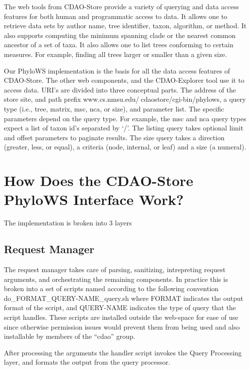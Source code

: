 \documentclass[10pt]{article}
\begin{document}
The web tools from CDAO-Store provide a variety of querying and data access features for both human and programmatic access to data. It allows one to retrieve data sets by author name, tree identifier, taxon, algorithm, or method. It also supports computing the minimum spanning clade or the nearest common ancestor of a set of taxa. It also allows one to list trees conforming to certain measures. For example, finding all trees larger or smaller than a given size. 

Our PhyloWS implementation is the basis for all the data access features of CDAO-Store. The other web components, and the CDAO-Explorer tool use it to access data. URI's are divided into three conceptual parts. The address of the store site, and path prefix www.cs.nmsu.edu/cdaostore/cgi-bin/phylows, a query type (i.e., tree, matrix, msc, nca, or size), and parameter list. The specific parameters depend on the query type. For example, the msc and nca query types expect a list of taxon id's separated by `/'. The listing query takes optional limit and offset parameters to paginate results. The size query takes a direction (greater, less, or equal), a criteria (node, internal, or leaf) and a size (a numeral).

\section{How Does the CDAO-Store PhyloWS Interface Work?}
The implementation is broken into 3 layers
  \subsection{Request Manager}
    The request manager takes care of parsing, sanitizing, intrepreting request arguments, and orchestrating  
   the remaining components. 
     In practice this is broken into a set of scripts named according to the following convention 
     do\_FORMAT\_QUERY-NAME\_query.sh where FORMAT indicates the output format of the script, and QUERY-NAME
     indicates the type of query that the script handles. These scripts are installed outside the web-space for
     ease of use since otherwise permission issues would prevent them from being used and also installable by
     members of the ``cdao'' group.

     After processing the arguments the handler script invokes the Query Processing layer, and formats the output
     from the query processor.
\end{document}
